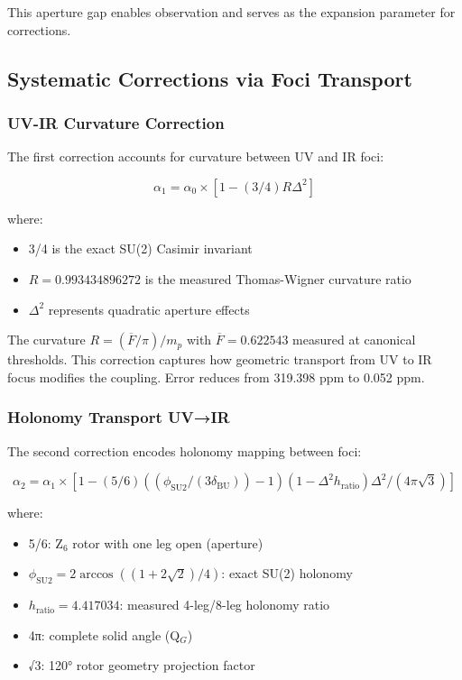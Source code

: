 \documentclass[11pt,a4paper]{article}
\theoremstyle{definition}
\theoremstyle{remark}
\begin{document}
This aperture gap enables observation and serves as the expansion parameter for corrections.

\subsection{Systematic Corrections via Foci Transport}

\subsubsection{UV-IR Curvature Correction}

The first correction accounts for curvature between UV and IR foci:

\begin{equation}
\alpha_1 = \alpha_0 \times [1 - (3/4) R \Delta^2] \tag{3}
\end{equation}

where:
\begin{itemize}
\item 3/4 is the exact SU(2) Casimir invariant
\item $R = 0.993434896272$ is the measured Thomas-Wigner curvature ratio
\item $\Delta^2$ represents quadratic aperture effects
\end{itemize}

The curvature $R = (\overline{F}/\pi)/m_p$ with $\overline{F} = 0.622543$ measured at canonical thresholds. This correction captures how geometric transport from UV to IR focus modifies the coupling. Error reduces from 319.398 ppm to 0.052 ppm.

\subsubsection{Holonomy Transport UV→IR}

The second correction encodes holonomy mapping between foci:

\begin{equation}
\alpha_2 = \alpha_1 \times \left[1 - (5/6) \left((\phi_{\mathrm{SU2}}/(3\delta_{\mathrm{BU}})) - 1\right) (1 - \Delta^2 h_{\mathrm{ratio}}) \Delta^2 / (4\pi \sqrt{3})\right] \tag{4}
\end{equation}

where:
\begin{itemize}
\item 5/6: Z$_6$ rotor with one leg open (aperture)
\item $\phi_{\mathrm{SU2}} = 2\arccos((1 + 2\sqrt{2})/4)$: exact SU(2) holonomy
\item $h_{\mathrm{ratio}} = 4.417034$: measured 4-leg/8-leg holonomy ratio
\item 4π: complete solid angle (Q$_G$)
\item √3: 120° rotor geometry projection factor
\end{itemize}
\end{document}
